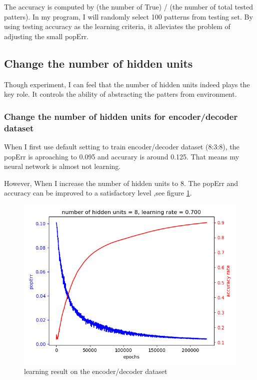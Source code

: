 \documentclass[11pt]{article}
\begin{document}
The accuracy is computed by (the number of True) / (the number of total tested patters). In my program, I will randomly select 100 patterns from testing set. By using testing accuracy as the learning criteria, it alleviates the problem of adjusting the small popErr.

\subsection{Change the number of hidden units}
\label{sec-3-2}
Though experiment, I can feel that the number of hidden units indeed plays the key role. It controls the ability of abstracting the patters from environment.
\subsubsection{Change the number of hidden units for encoder/decoder dataset}
\label{sec-3-2-1}
When I first use default setting to train encoder/decoder dataset (8:3:8), the popErr is aproaching to 0.095 and accurary is around 0.125. That means my neural network is almost not learning.

However, When I increase the number of hidden units to 8. The popErr and accuracy can be improved to a satisfactory level ,see figure \ref{fig-coder-8hidden}.

\begin{figure}[htb]
\centering
\includegraphics[width=.9\linewidth]{./popErr_vs_accuracy_on_coder.png}
\caption{learning result on the encoder/decoder dataset \label{fig-coder-8hidden}}
\end{figure}
\end{document}
